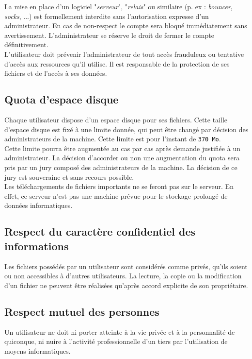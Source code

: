 \documentclass[10pt,a4paper]{article}
\begin{document}
La mise en place d'un logiciel "\textit{serveur}", "\textit{relais}" ou similaire (p. ex : \textit{bouncer}, \textit{socks}, ...) est formellement interdite sans l'autorisation expresse d'un administrateur. En cas de non-respect le compte sera bloqué immédiatement sans avertissement. L'administrateur se réserve le droit de fermer le compte définitivement.\\
L'utilisateur doit prévenir l'administrateur de tout accès frauduleux ou tentative d'accès aux ressources qu'il utilise. Il est responsable de la protection de ses fichiers et de l'accès à ses données.

\subsection{Quota d'espace disque}
Chaque utilisateur dispose d'un espace disque pour ses fichiers. Cette taille d'espace disque est fixé à une limite donnée, qui peut être changé par décision des administrateurs de la machine. Cette limite est pour l'instant de \texttt{370 Mo}.\\
Cette limite pourra être augmentée au cas par cas après demande justifiée à un administrateur. La décision d'accorder ou non une augmentation du quota sera pris par un jury composé des administrateurs de la machine. La décision de ce jury est souveraine et sans recours possible.\\


Les téléchargements de fichiers importants ne se feront pas sur le serveur. En effet, ce serveur n'est pas une machine prévue pour le stockage prolongé de données informatiques.

\subsection{Respect du caractère confidentiel des informations}
Les fichiers possédés par un utilisateur sont considérés comme privés, qu'ils soient ou non accessibles à d'autres utilisateurs. La lecture, la copie ou la modification d'un fichier ne peuvent être réalisées qu'après accord explicite de son propriétaire.

\subsection{Respect mutuel des personnes}
Un utilisateur ne doit ni porter atteinte à la vie privée et à la personnalité de quiconque, ni nuire à l'activité professionnelle d'un tiers par l'utilisation de moyens informatiques.
\end{document}
